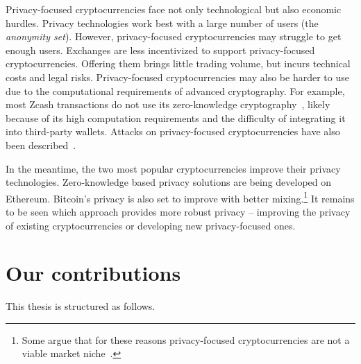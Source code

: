 Privacy-focused cryptocurrencies face not only technological but also economic hurdles.
Privacy technologies work best with a large number of users (the \textit{anonymity set}).
However, privacy-focused cryptocurrencies may struggle to get enough users.
Exchanges are less incentivized to support privacy-focused cryptocurrencies.
Offering them brings little trading volume, but incurs technical costs and legal risks.
Privacy-focused cryptocurrencies may also be harder to use due to the computational requirements of advanced cryptography.
For example, most Zcash transactions do not use its zero-knowledge cryptography~\cite{Quesnelle2017, Biryukov2019c}, likely because of its high computation requirements and the difficulty of integrating it into third-party wallets.
Attacks on privacy-focused cryptocurrencies have also been described~\cite{Quesnelle2017, Moeser2018, Biryukov2019d, Biryukov2019e, Tramer2020}.

In the meantime, the two most popular cryptocurrencies improve their privacy technologies.
Zero-knowledge based privacy solutions are being developed on Ethereum.
Bitcoin's privacy is also set to improve with better mixing.\footnote{Some argue that for these reasons privacy-focused cryptocurrencies are not a viable market niche~\cite{Gentry2019}.}
It remains to be seen which approach provides more robust privacy -- improving the privacy of existing cryptocurrencies or developing new privacy-focused ones.


\section{Our contributions}

This thesis is structured as follows.

